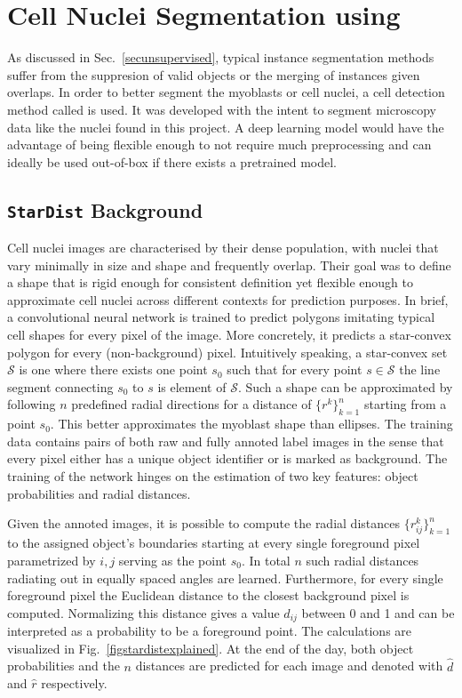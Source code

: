 \section{Cell Nuclei Segmentation using \stardist}\label{secstardist}
As discussed in Sec.~\ref{secunsupervised}, typical instance segmentation methods suffer from the suppresion of valid objects or the merging of instances given overlaps. In order to better segment the myoblasts or cell nuclei, a cell detection method called \stardist \cite{schmidt2018, weigert2020} is used. It was developed with the intent to segment microscopy data like the nuclei found in this project. A deep learning model would have the advantage of being flexible enough to not require much preprocessing and can ideally be used out-of-box if there exists a pretrained model.
\subsection{\texttt{StarDist} Background}
Cell nuclei images are characterised by their dense population, with nuclei that vary minimally in size and shape and frequently overlap. Their goal was to define a shape that is rigid enough for consistent definition yet flexible enough to approximate cell nuclei across different contexts for prediction purposes. In brief, a convolutional neural network is trained to predict polygons imitating typical cell shapes for every pixel of the image. More concretely, it predicts a star-convex polygon for every (non-background) pixel. Intuitively speaking, a star-convex set $\mathcal{S}$ is one where there exists one point $s_{0}$ such that for every point $s \in \mathcal{S}$ the line segment connecting $s_{0}$ to $s$ is element of $\mathcal{S}$. Such a shape can be approximated by following $n$ predefined radial directions for a distance of $\{r^{k}\}^{n}_{k = 1}$ starting from a point $s_{0}$. This better approximates the myoblast shape than ellipses. The training data contains pairs of both raw and fully annoted label images in the sense that every pixel either has a unique object identifier or is marked as background. The training of the network hinges on the estimation of two key features: object probabilities and radial distances.

Given the annoted images, it is possible to compute the radial distances $\{r^{k}_{ij}\}^{n}_{k = 1}$ to the assigned object's boundaries starting at every single foreground pixel parametrized by $i, j$ serving as the point  $s_{0}$. In total $n$ such radial distances radiating out in equally spaced angles are learned. Furthermore, for every single foreground pixel the Euclidean distance to the closest background pixel is computed. Normalizing this distance gives a value $d_{ij}$ between 0 and 1 and can be interpreted as a probability to be a foreground point. The calculations are visualized in Fig.~\ref{figstardistexplained}. At the end of the day, both object probabilities and the $n$ distances are predicted for each image and denoted with $\hat{d}$ and $\hat{r}$ respectively. 

